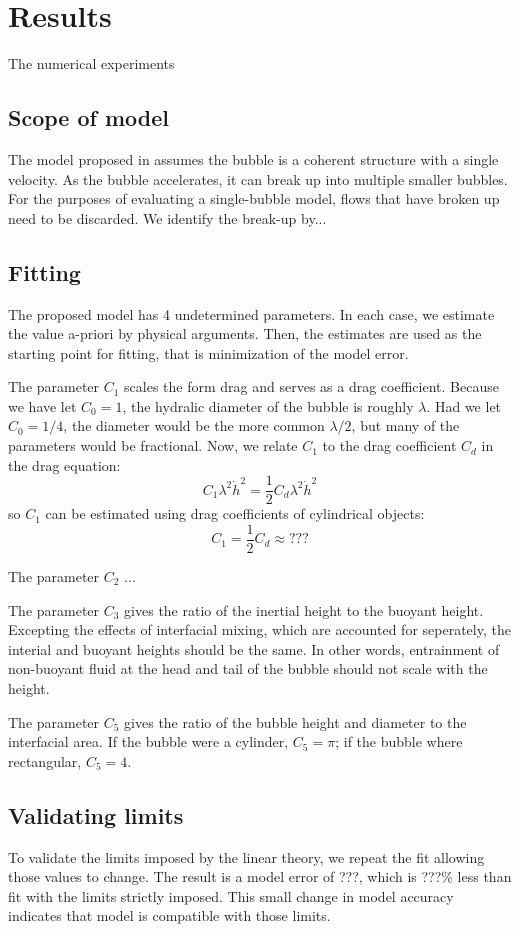 \section{Results}

The numerical experiments 

\subsection{Scope of model}

The model proposed in  assumes the bubble is a coherent structure with a single velocity.
As the bubble accelerates, it can break up into multiple smaller bubbles.
For the purposes of evaluating a single-bubble model, flows that have broken up need to be discarded.
We identify the break-up by...

\subsection{Fitting}
The proposed model has 4 undetermined parameters.
In each case, we estimate the value a-priori by physical arguments.
Then, the estimates are used as the starting point for fitting, that is minimization of the model error.

The parameter $C_1$ scales the form drag and serves as a drag coefficient.  
Because we have let $C_0 = 1$, the hydralic diameter of the bubble is roughly $\lambda$.
Had we let $C_0 = 1/4$, the diameter would be the more common $\lambda/2$, but many of the parameters would be fractional.
Now, we relate $C_1$ to the drag coefficient $C_d$ in the drag equation:
\begin{equation}
C_1 \lambda^2 \dot{h}^2 = \frac{1}{2} C_d \lambda^2 \dot{h}^2
\end{equation}
so $C_1$ can be estimated using drag coefficients of cylindrical objects:
\begin{equation}
C_1 = \frac{1}{2} C_d \approx ???
\end{equation}

The parameter $C_2$ ...

The parameter $C_3$ gives the ratio of the inertial height to the buoyant height.
Excepting the effects of interfacial mixing, which are accounted for seperately, the interial and buoyant heights should be the same.
In other words, entrainment of non-buoyant fluid at the head and tail of the bubble should not scale with the height.

The parameter $C_5$ gives the ratio of the bubble height and diameter to the interfacial area.
If the bubble were a cylinder, $C_5 = \pi$; if the bubble where rectangular, $C_5 = 4$.

\subsection{Validating limits}
To validate the limits imposed by the linear theory, we repeat the fit allowing those values to change.
The result is a model error of ???, which is ???\% less than fit with the limits strictly imposed.
This small change in model accuracy indicates that model is compatible with those limits.


